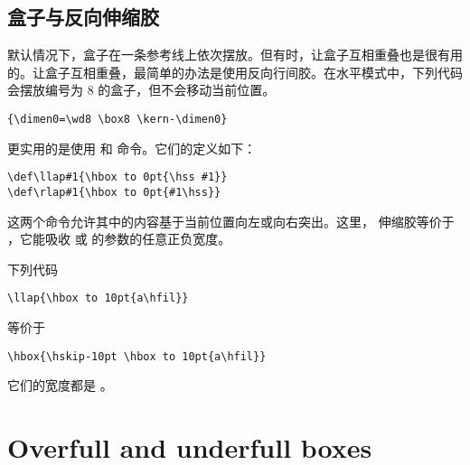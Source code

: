 \documentclass{book}
\begin{document}
\subsection{盒子与反向伸缩胶}

默认情况下，盒子在一条参考线上依次摆放。但有时，让盒子互相重叠也是很有用的。让盒子互相重叠，最简单的办法是使用反向行间胶。在水平模式中，下列代码会摆放编号为 8 的盒子，但不会移动当前位置。
\begin{verbatim}
{\dimen0=\wd8 \box8 \kern-\dimen0}
\end{verbatim}

更实用的是使用  和 \label{rlap} 命令。它们的定义如下：
\begin{verbatim}
\def\llap#1{\hbox to 0pt{\hss #1}}
\def\rlap#1{\hbox to 0pt{#1\hss}}
\end{verbatim}
这两个命令允许其中的内容基于当前位置向左或向右突出。这里， 伸缩胶等价于 ，它能吸收  或  的参数的任意正负宽度。

\begin{example}
下列代码
\begin{verbatim}
\llap{\hbox to 10pt{a\hfil}}
\end{verbatim}
等价于
\begin{verbatim}
\hbox{\hskip-10pt \hbox to 10pt{a\hfil}}
\end{verbatim}
它们的宽度都是 \n{0pt}。
\end{example}

\section{Overfull and underfull boxes}
\label{over/underfull}
\end{document}
